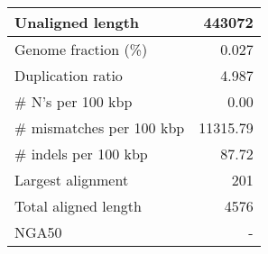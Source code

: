 \documentclass[12pt,a4paper]{article}
\begin{document}
\begin{table}[ht]
\begin{center}
\begin{tabular}{|l*{1}{|r}|}
Unaligned length & 443072 \\ \hline
Genome fraction (\%) & 0.027 \\ \hline
Duplication ratio & 4.987 \\ \hline
\# N's per 100 kbp & 0.00 \\ \hline
\# mismatches per 100 kbp & 11315.79 \\ \hline
\# indels per 100 kbp & 87.72 \\ \hline
Largest alignment & 201 \\ \hline
Total aligned length & 4576 \\ \hline
NGA50 & - \\ \hline
\end{tabular}
\end{center}
\end{table}
\end{document}
